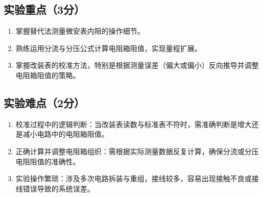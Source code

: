 \documentclass{../../templates/Report}%
\begin{document}
\subsection{实验重点（3分）}
\begin{enumerate}
    \item 掌握替代法测量微安表内阻的操作细节。
    \item 熟练运用分流与分压公式计算电阻箱阻值，实现量程扩展。
    \item 掌握改装表的校准方法，特别是根据测量误差（偏大或偏小）反向推导并调整电阻箱阻值的策略。
\end{enumerate}

\subsection{实验难点（2分）}
\begin{enumerate}
    \item 校准过程中的逻辑判断：当改装表读数与标准表不符时，需准确判断是增大还是减小电路中的电阻箱阻值。
    \item 正确计算并调整电阻箱组织：需根据实际测量数据反复计算，确保分流或分压电阻阻值的准确性。
    \item 实验操作繁琐：涉及多次电路拆装与重组，接线较多，容易出现接触不良或接线错误导致的系统误差。
\end{enumerate}
\end{document}
